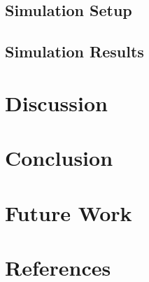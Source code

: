 \documentclass[answers,12pt,addpoints]{exam}
\begin{document}
\subsection{Simulation Setup}

\subsection{Simulation Results}
\section{Discussion}

\section{Conclusion}

\section{Future Work}

\section{References}
\end{document}
